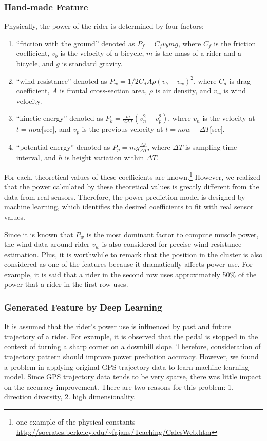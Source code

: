 \documentclass[runningheads]{llncs}
\begin{document}
\subsubsection{Hand-made Feature} \label{sec:hand_made_feature}
Physically, the power of the rider is determined by four factors: 
\begin{enumerate}
 \item “friction with the ground” denoted as $P_f=C_f v_b mg$, where $C_f$
       is the friction coefficient, $v_b$ is the velocity of a bicycle, $m$
       is the mass of a rider and a bicycle, and $g$ is standard gravity.
 \item “wind resistance” denoted as $P_w= 1/2 C_d A \rho(v_b-v_w )^2$,
       where $C_d$ is drag coefficient, $A$ is frontal cross-section area,
       $\rho$ is air density, and $v_w$ is wind velocity.
 \item “kinetic energy” denoted as 
       $P_k=\frac{m}{2\Delta T}(v_n^2-v_p^2)$, where $v_n$ is the velocity 
       at $t=now$[sec], and $v_p$ is the previous velocity at $t=now-\Delta T$[sec].
 \item “potential energy” denoted as $P_p = mg\frac{\Delta h}{\Delta T}$, 
       where $\Delta T$ is sampling time interval, and $h$ is height variation 
       within $\Delta T$.
\end{enumerate}
	
For each, theoretical values of these coefficients are
known.\footnote{one example of the physical constants\\ \url{http://socrates.berkeley.edu/~fajans/Teaching/CalcsWeb.htm}}
However, we realized that the power calculated by these theoretical
values is greatly different from the data from real sensors. Therefore,
the power prediction model is designed by machine learning, which
identifies the desired coefficients to fit with real sensor values.

Since it is known that $P_w$ is the most dominant factor to compute
muscle power, the wind data around rider $v_w$ is also considered for
precise wind resistance estimation. Plus, it is worthwhile to remark
that the position in the cluster is also considered as one of the
features because it dramatically affects power use. For example, it is
said that a rider in the second row uses approximately 50\% of the power
that a rider in the first row uses.


\subsubsection{Generated Feature by Deep Learning}
It is assumed that the rider's power use is influenced by past and future trajectory of a rider. For example, it is observed that the pedal is stopped in the context of turning a sharp corner on a downhill slope. Therefore, consideration of trajectory pattern should improve power prediction accuracy. However, we found a problem in applying original GPS trajectory data to learn machine learning model. Since GPS trajectory data tends to be very sparse, there was little impact on the accuracy improvement. There are two reasons for this problem: 1. direction diversity, 2. high dimensionality.
\end{document}

